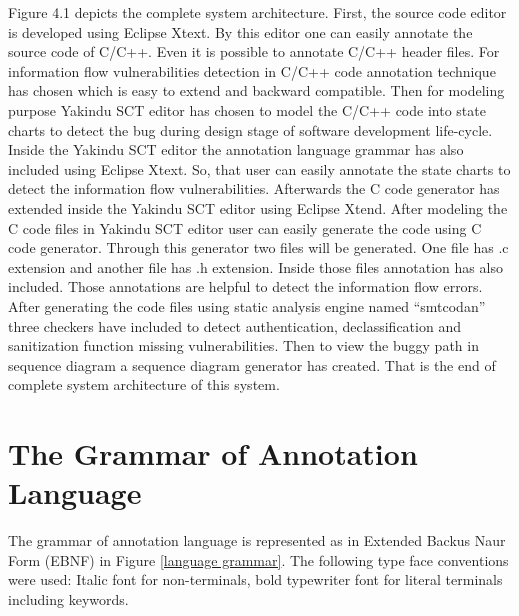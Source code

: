 Figure 4.1 depicts the complete system architecture. First, the source code editor is developed using Eclipse Xtext. By this editor one can easily annotate the source code of C/C++. Even it is possible to annotate C/C++ header files. For information flow vulnerabilities detection in C/C++ code annotation technique has chosen which is easy to extend and backward compatible. Then for modeling purpose Yakindu SCT editor \cite{ref_15_yakindu:sct} has chosen to model the C/C++ code into state charts to detect the bug during design stage of software development life-cycle. Inside the Yakindu SCT editor the annotation language grammar has also included using Eclipse Xtext. So, that user can easily annotate the state charts to detect the information flow vulnerabilities. Afterwards the C code generator has extended inside the Yakindu SCT editor using Eclipse Xtend. After modeling the C code files in Yakindu SCT editor user can easily generate the code using C code generator. Through this generator two files will be generated. One file has .c extension and another file has .h extension. Inside those files annotation has also included. Those annotations are helpful to detect the information flow errors. After generating the code files using static analysis engine named \enquote{smtcodan} three checkers have included to detect authentication, declassification and sanitization function missing vulnerabilities. Then to view the buggy path in sequence diagram a sequence diagram generator has created. That is the end of complete system architecture of this system. 


\section{The Grammar of Annotation Language}

The grammar of annotation language is represented as in Extended Backus Naur Form (EBNF) in Figure \ref{language grammar}. The following type face conventions were used: Italic font for non-terminals, bold typewriter font for literal terminals including keywords.\\
 
